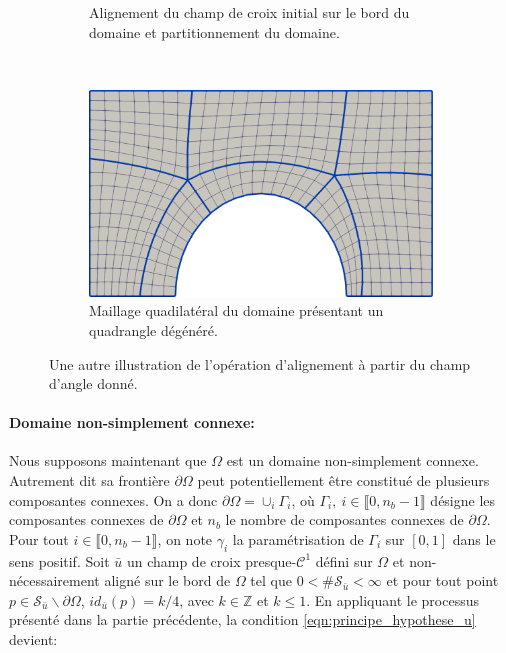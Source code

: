 \begin{figure}[!h]
\begin{subfigure}{0.58\textwidth}
    \caption{Alignement du champ de croix initial sur le bord du domaine et partitionnement du domaine.}
    \label{fig:rect_demi_disc_second}
\end{subfigure}
\\[0.46cm]
\begin{subfigure}{0.58\textwidth}
    \includegraphics[width=\textwidth]{images/rect_demi_disc_third.pdf}
    \caption{Maillage quadilatéral du domaine présentant un quadrangle dégénéré.}
    \label{fig:rect_demi_disc_third}
\end{subfigure}

\caption{Une autre illustration de l'opération d'alignement à partir du champ d'angle donné.}
\label{fig:rect_demi_disc}
\end{figure}

\paragraph{Domaine non-simplement connexe:}
Nous supposons maintenant que $\Omega$ est un domaine non-simplement connexe. Autrement dit sa frontière $\partial\Omega$ peut potentiellement être constitué de plusieurs composantes connexes. On a donc $\partial\Omega=\cup_i\Gamma_i$, où $\Gamma_i,~i\in\llbracket 0, n_b-1\rrbracket$ désigne les composantes connexes de $\partial\Omega$ et $n_b$ le nombre de composantes connexes de $\partial\Omega$. Pour tout $i\in\llbracket0, n_b-1\rrbracket$, on note $\gamma_i$ la paramétrisation de $\Gamma_i$ sur $[0, 1]$ dans le sens positif. Soit $\bar{u}$ un champ de croix presque-$\mathcal{C}^1$ défini sur $\Omega$ et non-nécessairement aligné sur le bord de $\Omega$ tel que $0<\#\mathcal{S}_{\bar{u}}<\infty$ et pour tout point $p\in\mathcal{S}_{\bar{u}}\backslash\partial\Omega$, $id_{\bar{u}}(p)=k/4$, avec $k\in\mathbb{Z}$ et $k\leq 1$. En appliquant le processus présenté dans la partie précédente, la condition \eqref{eqn:principe_hypothese_u} devient:

